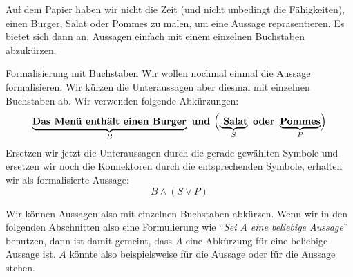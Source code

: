 \documentclass[../../main.tex]{subfiles}
\begin{document}
Auf dem Papier haben wir nicht die Zeit (und nicht unbedingt die Fähigkeiten), einen Burger, Salat oder Pommes zu malen, um eine Aussage repräsentieren. Es bietet sich dann an, Aussagen einfach mit einem einzelnen Buchstaben abzukürzen. 
 
 \begin{example}{Formalisierung mit Buchstaben}
 Wir wollen nochmal einmal die Aussage  formalisieren. Wir kürzen die Unteraussagen aber diesmal mit einzelnen Buchstaben ab. Wir verwenden folgende Abkürzungen:
     \[\underbrace{\textbf{Das Menü enthält einen Burger}}_{B}\textbf{~und~}\Bigl(\underbrace{\textbf{ Salat}}_{S}\textbf{~oder~}\underbrace{\textbf{Pommes}}_{P}\Bigr)\]
Ersetzen wir jetzt die Unteraussagen durch die gerade gewählten Symbole und ersetzen wir noch 
die Konnektoren durch die entsprechenden Symbole, erhalten wir als formalisierte Aussage:
    \[B \land (S \lor P)\]
 \end{example}

 Wir können Aussagen also mit einzelnen Buchstaben abkürzen. Wenn wir in den folgenden 
 Abschnitten also eine Formulierung wie \enquote{\textit{Sei A eine beliebige Aussage}} benutzen, dann
ist damit gemeint, dass $A$ eine Abkürzung für eine beliebige Aussage ist. $A$ könnte also 
beispielsweise für die Aussage  oder für die Aussage
 stehen.
\end{document}
